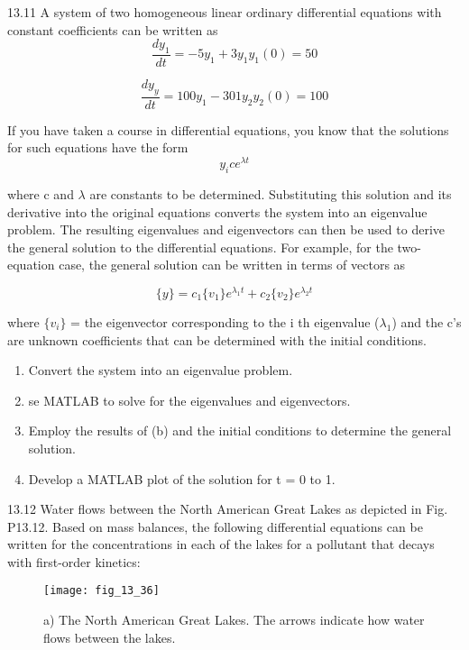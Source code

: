 \documentclass[../main.tex]{subfiles}
\begin{document}
13.11 A system of two homogeneous linear ordinary differential equations with constant coefficients can be written as
\begin{equation}
\frac{dy_{1}}{dt}=-5y_{1}+3y_{1}
y_{1}(0)=50
\end{equation}

\begin{equation}
\frac{dy_{y}}{dt}=100y_{1}-301y_{2}
y_{2}(0)=100
\end{equation}

If you have taken a course in differential equations, you
know that the solutions for such equations have the form
\begin{equation}
y_{i}ce^{\lambda t}
\end{equation}

where c and $\lambda$ are constants to be determined. Substituting
this solution and its derivative into the original equations
converts the system into an eigenvalue problem. The resulting eigenvalues and eigenvectors can then be used to derive
the general solution to the differential equations. For example, for the two-equation case, the general solution can be
written in terms of vectors as

\begin{equation}
\{y\}=c_{1}\{v_{1}\}e^{\lambda_{1}t}+c_{2}\{v_{2}\}e^{\lambda_{2}t}
\end{equation}

where $\{v_{i}\}$ = the eigenvector corresponding to the i
th eigenvalue ($\lambda_{1}$) and the c's are unknown coefficients that can be
determined with the initial conditions.

\begin{enumerate}[label=\alph*]
\item Convert the system into an eigenvalue problem.
\item se MATLAB to solve for the eigenvalues and eigenvectors.
\item Employ the results of (b) and the initial conditions to
determine the general solution.
\item Develop a MATLAB plot of the solution for t = 0 to 1.
\end{enumerate}

13.12 Water flows between the North American Great
Lakes as depicted in Fig. P13.12. Based on mass balances,
the following differential equations can be written for the
concentrations in each of the lakes for a pollutant that decays
with first-order kinetics:

\begin{figure}[H]
		\centering
		\texttt{[image: fig\_13\_36]}
	   \caption{\textsf{a) The North American Great Lakes. The arrows indicate how water
flows between the lakes.}}
	   \label{fig:fig_13_36}
\end{figure}
\end{document}
